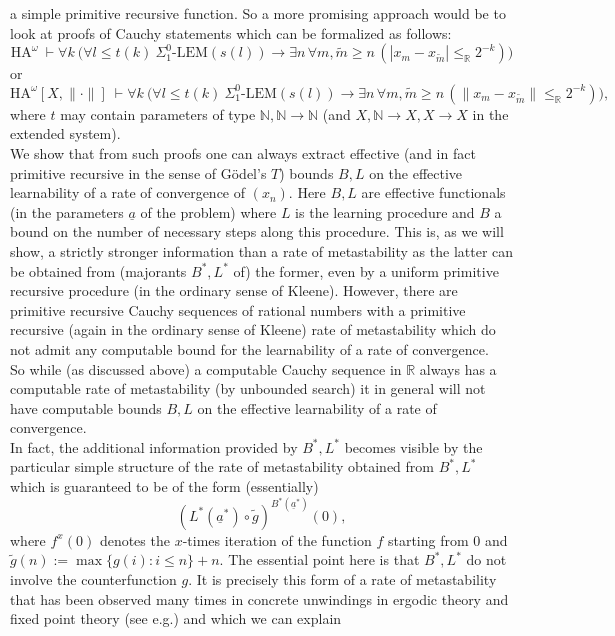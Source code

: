 \documentclass[1p]{elsarticle}
\newcommand{\RR}{\ensuremath{\mathbb{R}}}
\newcommand{\NN}{\ensuremath{\mathbb{N}}}
\theoremstyle{plain}
\theoremstyle{definition}
\theoremstyle{remark}
\theoremstyle{definition}
\begin{document}
a simple primitive recursive function. So a more promising approach would be
to look at proofs of Cauchy statements which can be formalized as follows:
\[ \mbox{HA}^{\omega}\ \vdash \forall k \  \big( \forall l\le t(k) \ 
\Sigma^0_1\mbox{-LEM}(s(l))\to \exists n\,\forall m,\tilde{m}\ge n\,
(|x_m-x_{\tilde{m}}|\le_{\RR} 2^{-k})\big) \] 
or 
\[ \mbox{HA}^{\omega}[X,\|\cdot\|] \ \vdash \forall k \  \big( \forall l\le 
t(k) \ 
\Sigma^0_1\mbox{-LEM}(s(l))\to \exists n\,\forall m,\tilde{m}\ge n\,
(\|x_m-x_{\tilde{m}}\|\le_{\RR} 2^{-k})\big), \]
where $t$ may contain parameters of type $\NN, \NN\to\NN$ (and $X,\NN\to X, 
X\to X$ in the extended system). \\[2mm] 
We show that from such proofs one can always extract effective (and in 
fact primitive recursive in the sense of G\"odel's $T$) bounds $B,L$ on the 
effective learnability of a rate of convergence of $(x_n).$ Here 
$B,L$ are effective functionals (in the parameters $\underline{a}$ 
of the problem) where 
$L$ is the learning procedure and $B$ a bound on the number of 
necessary steps along this procedure.  
This is, as we will show, a strictly stronger information than a 
rate of metastability as 
the latter can be obtained from (majorants $B^*,L^*$ of) the former, 
even by a uniform primitive 
recursive procedure (in the ordinary sense of Kleene). However, there are 
primitive recursive 
Cauchy sequences of rational numbers 
with a primitive recursive (again in the ordinary 
sense of Kleene) rate of metastability which 
do not admit any computable bound for the 
learnability of a rate of convergence. \\ So while (as discussed above) a 
computable Cauchy sequence in $\RR$ always has a computable rate of 
metastability (by unbounded search) it in general will not have computable 
bounds $B,L$ on the effective learnability of a rate of convergence.\\ 
In fact, the additional 
information provided by $B^*,L^*$ becomes visible by the particular 
simple structure of the rate of metastability obtained from 
$B^*,L^*$ which is guaranteed 
to be of the form (essentially) 
\[ (L^*(\underline{a}^*)\circ \tilde{g})^{B^*(\underline{a}^*)}(0), \] 
where $f^{x}(0)$ denotes the $x$-times iteration of the function $f$ 
starting from $0$ and $\tilde{g}(n):=\max\{ g(i):i\le n\}+n.$ 
The essential point here is that $B^*,L^*$ do not 
involve the counterfunction $g.$ It is precisely this form of a rate 
of metastability that has been observed many times in concrete unwindings 
in ergodic theory and fixed point theory (see e.g.\cite{Avigad/Gerhardy/Towsner,Kohlenbach/Leustean4,Kohlenbach/Leustean3,Kohlenbach(Browder),Kohlenbach/Leustean6,Kohlenbach/Leustean7}) and which we can explain 
\end{document}
